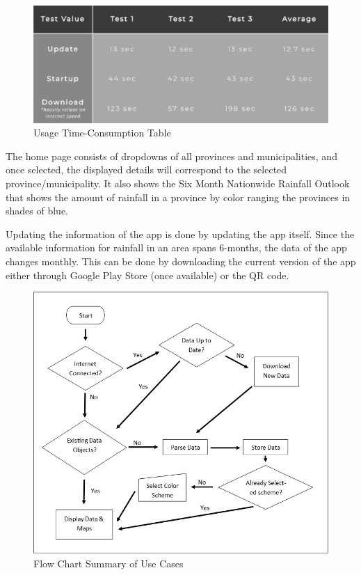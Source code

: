 \documentclass[letterpaper, 10 pt, conference]{ieeeconf}  %
\begin{document}
\begin{figure}[h!]
\centering
\includegraphics[scale=.5]{table}
\caption{Usage Time-Consumption Table}
\label{fig:table}
\end{figure}

The home page consists of dropdowns of all provinces and municipalities, and once selected, the displayed details will correspond to the selected province/municipality. It also shows the Six Month Nationwide Rainfall Outlook that shows the amount of rainfall in a province by color ranging the provinces in shades of blue.\setlength{\parskip}{6pt}

Updating the information of the app is done by updating the app itself. Since the available information for rainfall in an area spans 6-months, the data of the app changes monthly. This can be done by downloading the current version of the app either through Google Play Store (once available) or the QR code.


\begin{figure}[h!]
\centering
\includegraphics[scale=.4]{usecases}
\caption{Flow Chart Summary of Use Cases}
\label{fig:usecases}
\end{figure}
\end{document}
